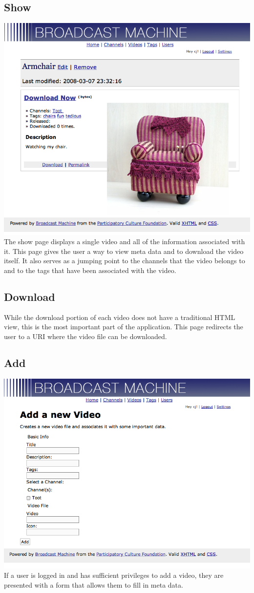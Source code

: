 \documentclass[a4paper,12pt]{report}
\begin{document}
\subsection{Show}
\includegraphics{images/videoshow.png}
The show page displays a single video and all of the information associated with it.
This page gives the user a way to view meta data and to download the video itself.
It also serves as a jumping point to the channels that the video belongs to and to the tags that have been associated with the video.

\subsection{Download}
While the download portion of each video does not have a traditional HTML view, this is the most important part of the application.
This page redirects the user to a URI where the video file can be downloaded.

\subsection{Add}
\includegraphics{images/videoadd.png}
If a user is logged in and has sufficient privileges to add a video, they are presented with a form that allows them to fill in meta data.
\end{document}
